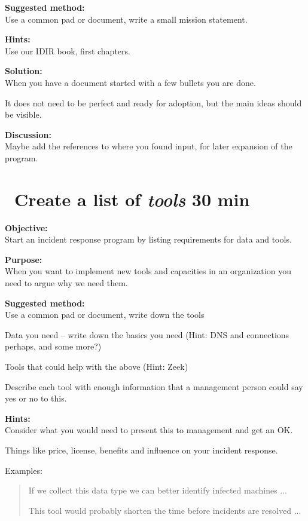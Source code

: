 \documentclass[a4paper,11pt,notitlepage]{report}
\begin{document}
{\bf Suggested method:}\\
Use a common pad or document, write a small mission statement.

{\bf Hints:}\\
Use our IDIR book, first chapters.

{\bf Solution:}\\
When you have a document started with a few bullets you are done.

It does not need to be perfect and ready for adoption, but the main ideas should be visible.

{\bf Discussion:}\\
Maybe add the references to where you found input, for later expansion of the program.

\chapter{\faExclamationTriangle\ Create a list of \emph{tools} 30 min}
\label{ex:tools-list}


{\bf Objective:}\\
Start an incident response program by listing requirements for data and tools.


{\bf Purpose:}\\
When you want to implement new tools and capacities in an organization you need to argue why we need them.

{\bf Suggested method:}\\
Use a common pad or document, write down the tools
\begin{list2}
\item Data you need -- write down the basics you need (Hint: DNS and connections perhaps, and some more?)
\item Tools that could help with the above (Hint: Zeek)
\item Describe each tool with enough information that a management person could say yes or no to this.
\end{list2}



{\bf Hints:}\\
Consider what you would need to present this to management and get an OK.

Things like price, license, benefits and influence on your incident response.

Examples:
\begin{quote}
If we collect this data type we can better identify infected machines ...

This tool would probably shorten the time before incidents are resolved ...
\end{quote}
\end{document}

